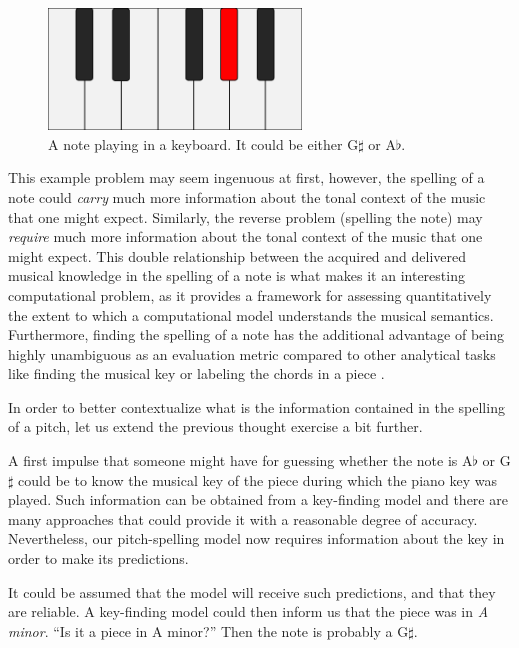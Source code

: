 \begin{figure}[h]
    \centering
    \includegraphics[width=0.6\textwidth]{figures/Q7_1.png}
    \caption{A note playing in a keyboard. It could be either G$\sharp$ or A$\flat$.}
    \label{fig:Q7_1}
\end{figure}

This example problem may seem ingenuous at first, however, the spelling of a note could \emph{carry} much more information about the tonal context of the music that one might expect. Similarly, the reverse problem (spelling the note) may \emph{require} much more information about the tonal context of the music that one might expect. This double relationship between the acquired and delivered musical knowledge in the spelling of a note is what makes it an interesting computational problem, as it provides a framework for assessing quantitatively the extent to which a computational model understands the musical semantics. Furthermore, finding the spelling of a note has the additional advantage of being highly unambiguous as an evaluation metric compared to other analytical tasks like finding the musical key \cite{gebhardt_confidence_2018} or labeling the chords in a piece \cite{ni_understanding_2013}.

In order to better contextualize what is the information contained in the spelling of a pitch, let us extend the previous thought exercise a bit further. 

A first impulse that someone might have for guessing whether the note is A$\flat$ or G$\sharp$ could be to know the musical key of the piece during which the piano key was played. Such information can be obtained from a key-finding model and there are many approaches that could provide it with a reasonable degree of accuracy. Nevertheless, our pitch-spelling model now requires information about the key in order to make its predictions. 

It could be assumed that the model will receive such predictions, and that they are reliable. A key-finding model could then inform us that the piece was in \emph{A minor}. ``Is it a piece in A minor?'' Then the note is probably a G$\sharp$.

